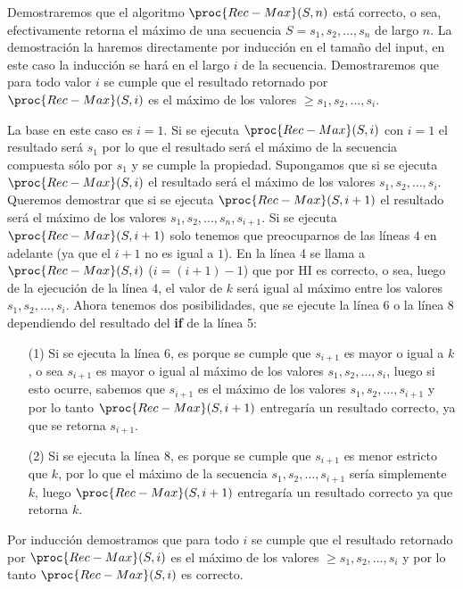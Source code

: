 \begin{ejemplo}
Demostraremos que el algoritmo $\proc{Rec-Max}(S,n)$ está correcto, o sea, efectivamente retorna el máximo de una secuencia $S=s_1,s_2,\ldots,s_n$ de largo $n$.
La demostración la haremos directamente por inducción en el tamaño del input, en este caso la inducción se hará en el largo $i$ de la secuencia.
Demostraremos que para todo valor $i$ se cumple que el resultado retornado por $\proc{Rec-Max}(S,i)$ es el máximo de los valores $\geq s_1,s_2,\ldots,s_i$.
\begin{inducciondemo}
  \BI La base en este caso es $i=1$.
  Si se ejecuta $\proc{Rec-Max}(S,i)$ con $i=1$ el resultado será $s_1$ por lo que el resultado será el máximo de la secuencia compuesta sólo por $s_1$ y se cumple la propiedad.
  \HI Supongamos que si se ejecuta $\proc{Rec-Max}(S,i)$ el resultado será el máximo de los valores $s_1,s_2,\ldots,s_i$.
  \TI Queremos demostrar que si se ejecuta $\proc{Rec-Max}(S,i+1)$ el resultado será el máximo de los valores $s_1,s_2,\ldots,s_n,s_{i+1}$.
  Si se ejecuta $\proc{Rec-Max}(S,i+1)$ solo tenemos que preocuparnos de las líneas $4$ en adelante (ya que el $i+1$ no es igual a $1$).
  En la línea 4 se llama a $\proc{Rec-Max}(S,i)$ ($i=(i+1)-1$) que por HI es correcto, o sea, luego de la ejecución de la línea 4, el valor de $k$ será igual al máximo entre los valores $s_1,s_2,\ldots,s_i$.
  Ahora tenemos dos posibilidades, que se ejecute la línea 6 o la línea 8 dependiendo del resultado del {\bf if} de la línea 5:
  \begin{itemize}
    \item[(1)] Si se ejecuta la línea 6, es porque se cumple que $s_{i+1}$ es mayor o igual a $k$, o sea $s_{i+1}$ es mayor o igual al máximo de los valores $s_1,s_2,\ldots,s_i$, luego si esto ocurre, sabemos que $s_{i+1}$ es el máximo de los valores $s_1,s_2,\ldots,s_{i+1}$ y por lo tanto $\proc{Rec-Max}(S,i+1)$ entregaría un resultado correcto, ya que se retorna $s_{i+1}$. 
    \item[(2)] Si se ejecuta la línea 8, es porque se cumple que $s_{i+1}$ es menor estricto que $k$, por lo que el máximo de la secuencia $s_1,s_2,\ldots,s_{i+1}$ sería simplemente $k$, luego $\proc{Rec-Max}(S,i+1)$ entregaría un resultado correcto ya que retorna $k$.
   \end{itemize}
\end{inducciondemo}
Por inducción demostramos que para todo $i$ se cumple que el resultado retornado por $\proc{Rec-Max}(S,i)$ es el máximo de los valores $\geq s_1,s_2,\ldots,s_i$ y por lo tanto $\proc{Rec-Max}(S,i)$ es correcto.
\end{ejemplo}


